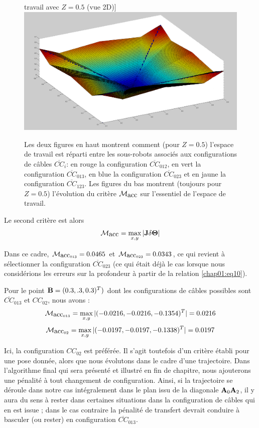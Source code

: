 \begin{figure}[!htp]
travail avec $Z = 0.5$ (vue 2D)]{\label{chap01:fig5view3}
    \includegraphics[width=.45\linewidth]{./chapter01/figures/crit_acc03.png}}
    \caption{\footnotesize Les deux figures en haut montrent comment (pour 
$Z = 0.5$) l'espace de travail est r\'eparti entre les sous-robots associ\'es 
aux configurations de c\^ables $\overline{CC}_i$: en rouge la configuration 
$\overline{CC}_{012}$, en vert la configuration $\overline{CC}_{013}$, en blue 
la configuration $\overline{CC}_{023}$ et en jaune la configuration 
$\overline{CC}_{123}$. Les figures du bas montrent (toujours pour $Z = 0.5$) 
l'\'evolution du crit\`ere $\mathcal M_{\hbox{acc}}$ sur l'essentiel de 
l'espace de travail.}
\label{chap01:fig5}
\end{figure}

Le second crit\`ere est alors
\begin{equation}
\mathcal M_{\hbox{acc}} = \max_{x,y} |{\bf J} \delta {\bf \Theta}|
\label{chap01:eq11}
\end{equation}

Dans ce cadre, $\mathcal M_{\hbox{acc}_{013}} = 0.0465$ et 
$\mathcal M_{\hbox{acc}_{023}} = 0.0343$, ce qui revient \`a s\'electionner la 
configuration $\overline{CC}_{023}$ (ce qui \'etait d\'ej\`a le cas lorsque 
nous consid\'erions les erreurs sur la profondeur \`a partir de la relation 
\ref{chap01:eq10}).

Pour le point ${\bf B} = (0.3,.3,0.3)^T)$ dont les configurations de c\^ables 
possibles sont $\overline{CC}_{013}$ et $CC_{02}$, nous avons :
$$\mathcal M_{\hbox{acc}_{013}} = \max_{x,y} |(-0.0216,-0.0216,-0.1354)^T| = 
0.0216$$ 
$$\mathcal M_{\hbox{acc}_{02}} = \max_{x,y} |( -0.0197, -0.0197, -0.1338)^T| 
= 0.0197$$

Ici, la configuration $CC_{02}$ est pr\'ef\'er\'ee. Il s'agit toutefois d'un 
crit\`ere \'etabli pour une pose donn\'ee, alors que nous \'evolutons dans le 
cadre d'une trajectoire. Dans l'algorithme final qui sera pr\'esent\'e et 
illustr\'e en fin de chapitre, nous ajouterons une p\'enalit\'e \`a tout 
changement de configuration. Ainsi, si la trajectoire se d\'eroule dans notre 
cas int\'egralement dans le plan issu de la diagonale ${\bf A}_0{\bf A}_2$, il 
y aura du sens \`a rester dans certaines situations dans la configuration de 
c\^ables qui en est issue ; dans le cas contraire la p\'enalit\'e de transfert 
devrait conduire \`a basculer (ou rester) en configuration 
$\overline{CC}_{013}$.


